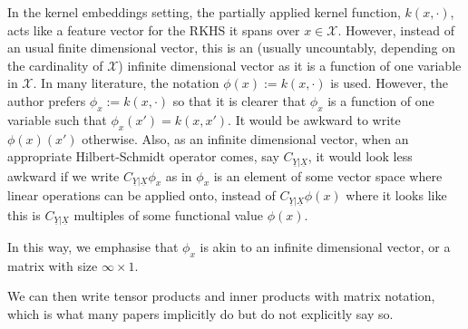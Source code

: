 \documentclass[twoside]{article} \usepackage{aistats2017}
\newcommand{\rv}[1]{\underline{#1}}
\begin{document}
	In the kernel embeddings setting, the partially applied kernel function, $k(x, \cdot)$, acts like a feature vector for the RKHS it spans over $x \in \mathcal{X}$. However, instead of an usual finite dimensional vector, this is an (usually uncountably, depending on the cardinality of $\mathcal{X}$) infinite dimensional vector as it is a function of one variable in $\mathcal{X}$. In many literature, the notation $\phi(x) := k(x, \cdot)$ is used. However, the author prefers $\phi_{x} := k(x, \cdot)$ so that it is clearer that $\phi_{x}$ is a function of one variable such that $\phi_{x}(x') = k(x, x')$. It would be awkward to write $\phi(x)(x')$ otherwise. Also, as an infinite dimensional vector, when an appropriate Hilbert-Schmidt operator comes, say $C_{\rv{Y} | \rv{X}}$, it would look less awkward if we write $C_{\rv{Y} | \rv{X}} \phi_{x}$ as in $\phi_{x}$ is an element of some vector space where linear operations can be applied onto, instead of $C_{\rv{Y} | \rv{X}} \phi(x)$ where it looks like this is $C_{\rv{Y} | \rv{X}}$ multiples of some functional value $\phi(x)$.
	
	In this way, we emphasise that $\phi_{x}$ is akin to an infinite dimensional vector, or a matrix with size $\infty \times 1$.
	
	We can then write tensor products and inner products with matrix notation, which is what many papers implicitly do but do not explicitly say so.
	
\end{document}
